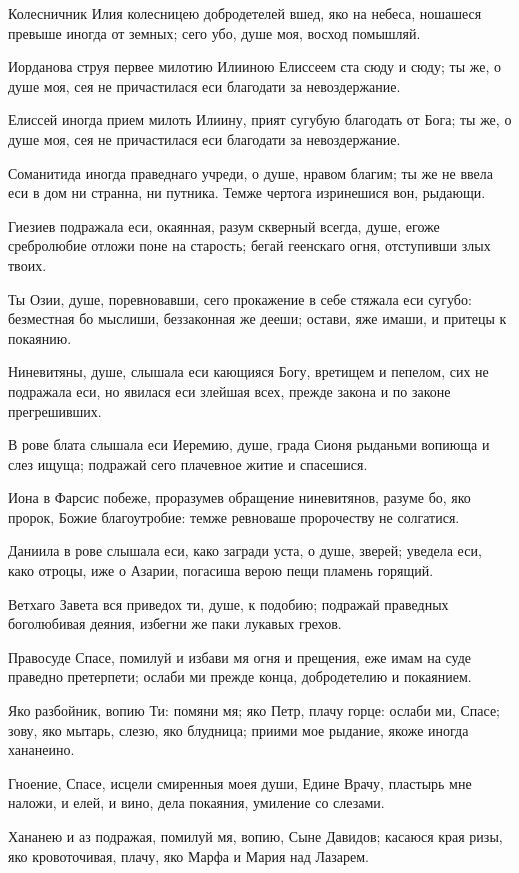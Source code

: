 Колесничник Илия колесницею добродетелей вшед, яко на небеса, ношашеся превыше иногда от земных; сего убо, душе моя, восход помышляй.

Иорданова струя первее милотию Илииною Елиссеем ста сюду и сюду; ты же, о душе моя, сея не причастилася еси благодати за невоздержание.

Елиссей иногда прием милоть Илиину, прият сугубую благодать от Бога; ты же, о душе моя, сея не причастилася еси благодати за невоздержание.

Соманитида иногда праведнаго учреди, о душе, нравом благим; ты же не ввела еси в дом ни странна, ни путника. Темже чертога изринешися вон, рыдающи.

Гиезиев подражала еси, окаянная, разум скверный всегда, душе, егоже сребролюбие отложи поне на старость; бегай геенскаго огня, отступивши злых твоих.

Ты Озии, душе, поревновавши, сего прокажение в себе стяжала еси сугубо: безместная бо мыслиши, беззаконная же дееши; остави, яже имаши, и притецы к покаянию.

Ниневитяны, душе, слышала еси кающияся Богу, вретищем и пепелом, сих не подражала еси, но явилася еси злейшая всех, прежде закона и по законе прегрешивших.

В рове блата слышала еси Иеремию, душе, града Сионя рыданьми вопиюща и слез ищуща; подражай сего плачевное житие и спасешися.

Иона в Фарсис побеже, проразумев обращение ниневитянов, разуме бо, яко пророк, Божие благоутробие: темже ревноваше пророчеству не солгатися.

Даниила в рове слышала еси, како загради уста, о душе, зверей; уведела еси, како отроцы, иже о Азарии, погасиша верою пещи пламень горящий.

Ветхаго Завета вся приведох ти, душе, к подобию; подражай праведных боголюбивая деяния, избегни же паки лукавых грехов.

Правосуде Спасе, помилуй и избави мя огня и прещения, еже имам на суде праведно претерпети; ослаби ми прежде конца, добродетелию и покаянием.

Яко разбойник, вопию Ти: помяни мя; яко Петр, плачу горце: ослаби ми, Спасе; зову, яко мытарь, слезю, яко блудница; приими мое рыдание, якоже иногда хананеино.

Гноение, Спасе, исцели смиренныя моея души, Едине Врачу, пластырь мне наложи, и елей, и вино, дела покаяния, умиление со слезами.

Хананею и аз подражая, помилуй мя, вопию, Сыне Давидов; касаюся края ризы, яко кровоточивая, плачу, яко Марфа и Мария над Лазарем.

